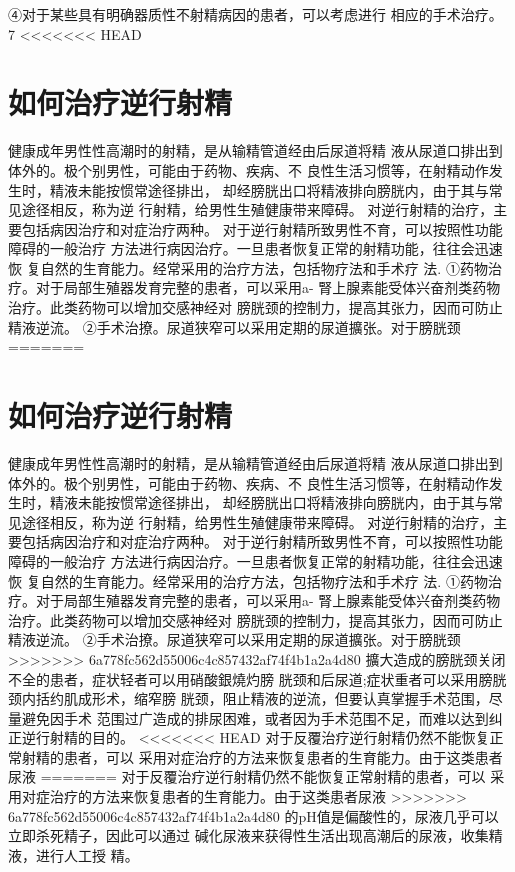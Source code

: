 \documentclass[12pt,UTF8]{ctexbook}
\begin{document}
④对于某些具有明确器质性不射精病因的患者，可以考虑进行
相应的手术治疗。
7
<<<<<<< HEAD
\section{如何治疗逆行射精}
健康成年男性性高潮时的射精，是从输精管道经由后尿道将精
液从尿道口排出到体外的。极个别男性，可能由于药物、疾病、不
良性生活习惯等，在射精动作发生时，精液未能按惯常途径排出，
却经膀胱出口将精液排向膀胱内，由于其与常见途径相反，称为逆
行射精，给男性生殖健康带来障碍。
对逆行射精的治疗，主要包括病因治疗和对症治疗两种。
对于逆行射精所致男性不育，可以按照性功能障碍的一般治疗
方法进行病因治疗。一旦患者恢复正常的射精功能，往往会迅速恢
复自然的生育能力。经常采用的治疗方法，包括物疗法和手术疗
法.
①药物治疗。对于局部生殖器发育完整的患者，可以采用a-
腎上腺素能受体兴奋剂类药物治疗。此类药物可以增加交感神经对
膀胱颈的控制力，提高其张力，因而可防止精液逆流。
②手术治撩。尿道狭窄可以采用定期的尿道擴张。对于膀胱颈
=======
\section{如何治疗逆行射精}
健康成年男性性高潮时的射精，是从输精管道经由后尿道将精
液从尿道口排出到体外的。极个别男性，可能由于药物、疾病、不
良性生活习惯等，在射精动作发生时，精液未能按惯常途径排出，
却经膀胱出口将精液排向膀胱内，由于其与常见途径相反，称为逆
行射精，给男性生殖健康带来障碍。
对逆行射精的治疗，主要包括病因治疗和对症治疗两种。
对于逆行射精所致男性不育，可以按照性功能障碍的一般治疗
方法进行病因治疗。一旦患者恢复正常的射精功能，往往会迅速恢
复自然的生育能力。经常采用的治疗方法，包括物疗法和手术疗
法.
①药物治疗。对于局部生殖器发育完整的患者，可以采用a-
腎上腺素能受体兴奋剂类药物治疗。此类药物可以增加交感神经对
膀胱颈的控制力，提高其张力，因而可防止精液逆流。
②手术治撩。尿道狭窄可以采用定期的尿道擴张。对于膀胱颈
>>>>>>> 6a778fc562d55006c4c857432af74f4b1a2a4d80
擴大造成的膀胱颈关闭不全的患者，症状轻者可以用硝酸銀燒灼膀
胱颈和后尿道;症状重者可以采用膀胱颈内括约肌成形术，缩窄膀
胱颈，阻止精液的逆流，但要认真掌握手术范围，尽量避免因手术
范围过广造成的排尿困难，或者因为手术范围不足，而难以达到纠
正逆行射精的目的。
<<<<<<< HEAD
对于反覆治疗逆行射精仍然不能恢复正常射精的患者，可以
采用对症治疗的方法来恢复患者的生育能力。由于这类患者尿液
=======
对于反覆治疗逆行射精仍然不能恢复正常射精的患者，可以
采用对症治疗的方法来恢复患者的生育能力。由于这类患者尿液
>>>>>>> 6a778fc562d55006c4c857432af74f4b1a2a4d80
的pH值是偏酸性的，尿液几乎可以立即杀死精子，因此可以通过
碱化尿液来获得性生活出现高潮后的尿液，收集精液，进行人工授
精。
\end{document}
